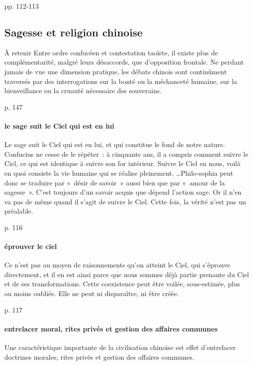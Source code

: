\cite{PolDroit:voyage} pp. 112-113 

\subsection{Sagesse et religion chinoise}

\begin{Synthesis}
À retenir Entre ordre confucéen et contestation taoïste, il existe plus de complémentarité, malgré leurs désaccords, que d’opposition frontale. Ne perdant jamais de vue une dimension pratique, les débats chinois sont continûment traversés par des interrogations sur la bonté ou la méchanceté humaine, sur la bienveillance ou la cruauté nécessaire des souverains.

\cite{PolDroit:voyage} p. 147 
\end{Synthesis}

\paragraph{le sage suit le Ciel qui est en lui} Le sage suit le Ciel qui est en lui, et qui constitue le fond de notre nature. Confucius ne cesse de le répéter : à cinquante ans, il a compris comment suivre le Ciel, ce qui est identique à suivre son for intérieur. Suivre le Ciel en nous, voilà en quoi consiste la vie humaine qui se réalise pleinement.
\ldots Philo-sophia peut donc se traduire par « désir de savoir » aussi bien que par « amour de la sagesse ». C’est toujours d’un savoir acquis que dépend l’action sage. Or il n’en va pas de même quand il s’agit de suivre le Ciel. Cette fois, la vérité n’est pas un préalable.

\cite{PolDroit:voyage} p. 116 


\paragraph{éprouver le ciel} Ce n’est pas au moyen de raisonnements qu’on atteint le Ciel, qui s’éprouve directement, et il en est ainsi parce que nous sommes déjà partie prenante du Ciel et de ses transformations. Cette coexistence peut être voilée, sous-estimée, plus ou moins oubliée. Elle ne peut ni disparaître, ni être créée.

\cite{PolDroit:voyage} p. 117 


\paragraph{entrelacer moral, rites privés et gestion des affaires communes} Une caractéristique importante de la civilisation chinoise est effet d’entrelacer doctrines morales, rites privés et gestion des affaires communes.

